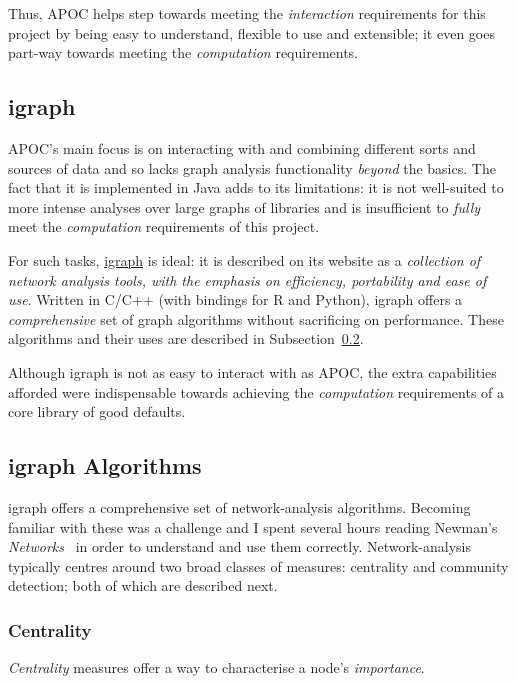 Thus, APOC helps step towards meeting the \emph{interaction} requirements for
this project by being easy to understand, flexible to use and extensible; it
even goes part-way towards meeting the \emph{computation} requirements.

\subsection{igraph}\label{subsubsec:neo4jtoolsigraph}

APOC's main focus is on interacting with and combining different sorts and
sources of data and so lacks graph analysis functionality \emph{beyond} the
basics. The fact that it is implemented in Java adds to its limitations: it is
not well-suited to more intense analyses over large graphs of libraries and is
insufficient to \emph{fully} meet the \emph{computation} requirements of this
project.

For such tasks, \href{http://www.igraph.org}{igraph} is ideal: it is described
on its website as a \emph{collection of network analysis tools, with the
emphasis on efficiency, portability and ease of use}. Written in C/C++ (with
bindings for R and Python), igraph offers a \emph{comprehensive} set of graph
algorithms without sacrificing on performance. These algorithms and their uses
are described in Subsection~\ref{subsec:igraphalg}.

Although igraph is not as easy to interact with  as APOC, the extra capabilities
afforded were indispensable towards achieving the \emph{computation}
requirements of a core library of good defaults.

\subsection{igraph Algorithms}\label{subsec:igraphalg}

igraph offers a comprehensive set of network-analysis algorithms. Becoming
familiar with these was a challenge and I spent several hours reading Newman's
\emph{Networks}~\cite{newman2008} in order to understand and use them correctly.
Network-analysis typically centres around two broad classes of measures:
centrality and community detection; both of which are described next.

\subsubsection{Centrality}

\emph{Centrality} measures offer a way to characterise a node's \emph{importance}.

